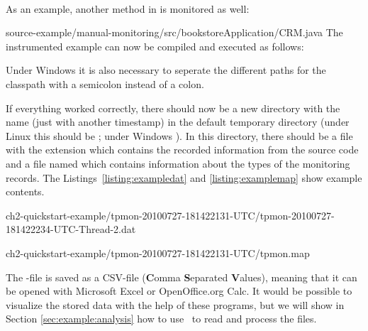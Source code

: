 \quad\\

\noindent As an example, another method in  is monitored as well:

\setJavaCodeListing
%
{source-example/manual-monitoring/src/bookstoreApplication/CRM.java}
The instrumented example can now be compiled and executed as follows:

\setBashListing 		
	
\warning Under Windows it is also necessary to seperate the different paths for the classpath with a semicolon instead of a colon.
				

If everything worked correctly, there should now be a new directory with the %
name  (just with another timestamp) in the default %
temporary directory (under Linux this should be ; under Windows %
). In this directory, there should be a file with the extension %
 which contains the recorded information from the source code and %
a file named  which contains information about the types of the %
monitoring records. %
The Listings~\ref{listing:exampledat} and \ref{listing:examplemap} show example %
contents. 
\begin{figure}[H]
\begin{graybox}
\end{graybox}
\end{figure}

\setBashListing
%
{ch2-quickstart-example/tpmon-20100727-181422131-UTC/tpmon-20100727-181422234-UTC-Thread-2.dat}

%
{ch2-quickstart-example/tpmon-20100727-181422131-UTC/tpmon.map}

The -file is saved as a CSV-file (\textbf{C}omma \textbf{S}eparated \textbf{V}alues), meaning that it can be opened with Microsoft Excel or OpenOffice.org Calc. It would be possible to visualize the stored data with the help of these programs, but we will show in Section \ref{sec:example:analysis} how to use \KiekerAnalysisPart\ to read and process the files.

